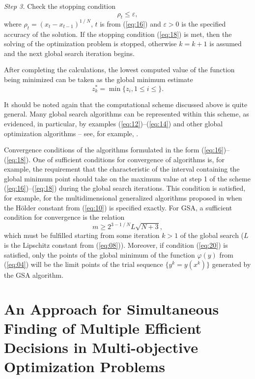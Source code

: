 \documentclass[runningheads]{llncs}
\begin{document}
\textit{Step 3.} Check the stopping condition
\begin{equation}
\label{eq:18}
\rho_t \leq \varepsilon,
\end{equation}
where $\rho_t = (x_t-x_{t-1})^{1⁄N}$, $t$ is from (\ref{eq:16}) and $\varepsilon > 0$ is the specified accuracy of the solution. If the stopping condition (\ref{eq:18}) is met, then the solving of the optimization problem is stopped, otherwise $k=k+1$ is assumed and the next global search iteration begins.

After completing the calculations, the lowest computed value of the function being minimized can be taken as the global minimum estimate
\begin{equation}
\label{eq:19}
z_k^* = \min \{ z_i, 1 \leq i \leq \}.
\end{equation}

It should be noted again that the computational scheme discussed above is quite general. Many global search algorithms can be represented within this scheme, as evidenced, in particular, by examples (\ref{eq:12})--(\ref{eq:14}) and other global optimization algorithms -- see, for example, \cite{c28,c29,c30,c31,c32,c33,c34,c35,c36,c37}. 

Convergence conditions of the algorithms formulated in the form (\ref{eq:16})--(\ref{eq:18}). One of sufficient conditions for convergence of algorithms is, for example, the requirement that the characteristic of the interval containing the global minimum point should take on the maximum value at step 1 of the scheme (\ref{eq:16})--(\ref{eq:18}) during the global search iterations. This condition is satisfied, for example, for the multidimensional generalized algorithms proposed in \cite{c22,c23} when the H{\"o}lder constant from (\ref{eq:10}) is specified exactly. For GSA, a sufficient condition for convergence is the relation \cite{c15}
\begin{equation}
\label{eq:20}
m \geq 2^{3-1⁄N} L\sqrt{N+3},
\end{equation}
which must be fulfilled starting from some iteration $k>1$ of the global search ($L$ is the Lipschitz constant from (\ref{eq:08})). Moreover, if condition (\ref{eq:20}) is satisfied, only the points of the global minimum of the function $\varphi(y)$ from (\ref{eq:04}) will be the limit points of the trial sequence $\{y^k=y(x^k)\}$ generated by the GSA algorithm.

\section{An Approach for Simultaneous Finding of Multiple Efficient Decisions in Multi-objective Optimization Problems} \label{sec:04}
\end{document}
